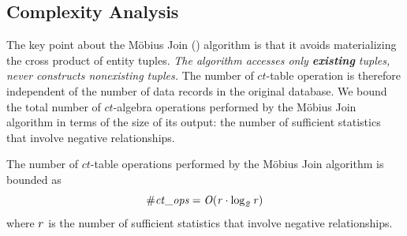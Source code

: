 \documentclass{acm_proc_article-sp}
\newcommand{\ct}{\mathit{ct}}
\begin{document}
\subsection{Complexity Analysis} 
\label{sec:complexity} 

The key point about the M\"obius Join (\MJ) algorithm %
is that it avoids materializing the cross product of entity tuples. {\em The algorithm accesses  only \textbf{existing} tuples, never constructs nonexisting tuples.} The number of $\ct$-table operation is therefore independent of the number of data records in the original database. We bound the total number of $\ct$-algebra operations performed by the M\"obius Join algorithm in terms of the size of its output: the number of sufficient statistics that involve negative relationships. 
%
\begin{proposition}
The number of $\ct$-table operations performed by the M\"obius Join algorithm is bounded as $$\it{\# \ct\_\it{ops}} = O(r \cdot \log_{2} r)$$ where $r$ is the number of sufficient statistics that involve negative relationships.
\end{proposition}
%
%
\end{document}
